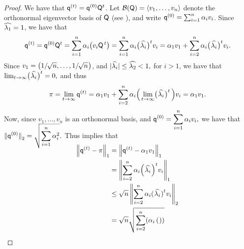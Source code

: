 \begin{proof}
    We have that $\mathbf{\mathsf{q}}^{(t)} = \mathbf{\mathsf{q}}^{(0)}\mathsf{Q}^t$.  Let
    $\mathcal{B}(\mathsf{Q})= \left\langle {v_1,\ldots, v_n} \right\rangle$ denote the orthonormal
    eigenvector basis of $\mathsf{Q}$ (see
    ), and write $\mathbf{\mathsf{q}}^{(0)}=
    \sum_{i=1}^n \alpha_i v_i$. Since $\widehat{\lambda_{1}}=1$, we have that
    \begin{equation*}
        \DstrbV{t}%
        =%
        \DstrbV{0}\TMtrx^t%
        =%
        \sum_{i=1}^n \alpha_i \pth[]{\bigl. v_i\TMtrx^{\, t} }%
        =%
        \sum_{i=1}^n \alpha_i \bigl(\ts\TEV{i}\ts\bigr)^t v_i%
        =%
        \alpha_1 v_1 + \sum_{i=2}^n \alpha_i \bigl(\ts \TEV{i} \ts\bigr)^t
        v_i.
    \end{equation*}
    Since
    $v_1 = \bigl(1/\,\hspace{0.6pt}\!\!\sqrt{n}, \ldots, 1/\,\hspace{0.6pt}\!\!\sqrt{n}\hspace{0.6pt}\bigr)$, and
    \begin{math}
        | \widehat{\lambda_{i}} | \leq \widehat{\lambda_{2}} < 1,
    \end{math}
    for $i >1$, we have that
    \begin{math}
        \lim_{t\rightarrow \infty}\bigl( \hspace{0.6pt} \widehat{\lambda_{i}}\hspace{0.6pt} \bigr)^t = 0,
    \end{math}
    and thus
    \begin{equation*}
        \pi%
        =%
        \lim_{t\rightarrow \infty} \DstrbV{t}%
        =%
        \alpha_1 v_1 + \sum_{i=2}^n \alpha_i \pth[]{\,
           \lim_{t\rightarrow \infty}
           \bigl( \ts\TEV{i}\ts \bigr)^t \,} v_i%
        =%
        \alpha_1 v_1.
    \end{equation*}   
    Now, since $v_1, \ldots, v_n$ is an orthonormal basis, and
    \begin{math}
        \displaystyle \mathbf{\mathsf{q}}^{(0)} = \sum_{i=1}^n \alpha_i v_i,
    \end{math}
    we have that
    \begin{math}
        \ds%
        \norm{\smash{\DstrbV{0}}}_2%
        =%
        \smash{\sqrt{\sum_{i=1}^n
              \alpha_i^2}}.
    \end{math}
     Thus implies that
    \begin{align*}
      \norm{\DstrbV{t} - \pi}_1%
      &=%
        \norm{\DstrbV{t} - \alpha_1 v_1}_1%
      \\&=%
        \norm{\sum_{i=2}^n \alpha_i \pth[]{\ts\TEV{i}\ts}^t v_i}_1%
      \\&\leq%
        \sqrt{n} \norm{\sum_{i=2}^n \alpha_i \pth[]{\ts \smash{\TEV{i}} \ts
        }^t v_i}_2%
      \\&=%
        \sqrt{n} \sqrt{\sum_{i=2}^n \pth[]{ \alpha_i\, \pth[]{\ts
}}}
\end{align*}
\end{proof}
